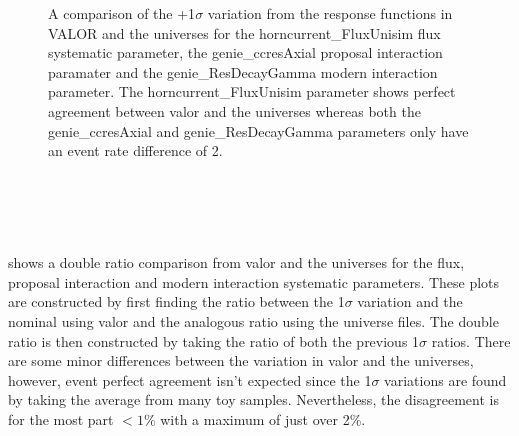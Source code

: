 \begin{figure}[h!]
  \captionsetup{width=0.49\textwidth}
  \parbox[b]{0.49\textwidth}%
  {
   \caption[+1$\sigma$ variation comparison for the horncurrent\_FluxUnisim, genie\_ccresAxial and genie\_ResDecayGamma parameters.]{A comparison of the +1$\sigma$ variation from the response functions in VALOR and the universes for the horncurrent\_FluxUnisim flux systematic parameter, the genie\_ccresAxial proposal interaction paramater and the genie\_ResDecayGamma modern interaction parameter. The horncurrent\_FluxUnisim parameter shows perfect agreement between \gls{valor} and the universes whereas both the genie\_ccresAxial and genie\_ResDecayGamma parameters only have an event rate difference of 2. \\\\\\\\\\}
   \label{fig:+1sigma_variations}}
\end{figure}

 shows a double ratio comparison from \gls{valor} and the universes for the flux, proposal interaction and modern interaction systematic parameters. These plots are constructed by first finding the ratio between the 1$\sigma$ variation and the nominal using \gls{valor} and the analogous ratio using the universe files. The double ratio is then constructed by taking the ratio of both the previous 1$\sigma$ ratios. There are some minor differences between the variation in \gls{valor} and the universes, however, event perfect agreement isn't expected since the 1$\sigma$ variations are found by taking the average from many toy samples. Nevertheless, the disagreement is for the most part $< 1\%$ with a maximum of just over 2\%. 

